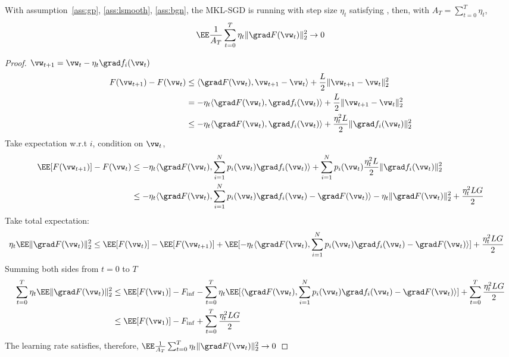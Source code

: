 \begin{theorem}
	With assumption~\ref{ass:gp}, \ref{ass:lsmooth}, \ref{ass:bgn}, the MKL-SGD is running with
	step size $\eta_t$ satisfying \eq{\ref{eq:stepsize}}, then, with $A_T =\sum_{t=0}^T\eta_t $, 
	\begin{equation}
		\EE \frac{1}{A_T}\sum_{t=0}^T \eta_t\|\grad F(\vw_t)\|_2^2 \rightarrow 0
	\end{equation}
\end{theorem}
\begin{proof}
$\vw_{t+1} = \vw_t - \eta_t \grad f_i(\vw_t)$
\begin{align*}
	F(\vw_{t+1}) - F(\vw_{t}) & \leq \langle \grad F(\vw_t), \vw_{t+1} - \vw_t \rangle + \frac{L}{2}\|\vw_{t+1} - \vw_t\|_2^2  \\
                              &  = - \eta_t \langle \grad F(\vw_t), \grad f_i(\vw_t)\rangle  + \frac{L}{2}\|\vw_{t+1} - \vw_t\|_2^2  \\
                              & \leq - \eta_t \langle \grad F(\vw_t), \grad f_i(\vw_t)\rangle  + \frac{\eta_t^2 L}{2}\|\grad f_i(\vw_t)\|_2^2 
\end{align*}
Take expectation w.r.t $i$, condition on $\vw_t$, 
\begin{align*}
	\EE[F(\vw_{t+1})] - F(\vw_{t}) & \leq - \eta_t \langle \grad F(\vw_t),\sum_{i=1}^N p_i(\vw_t)\grad f_i(\vw_t) \rangle + \sum_{i=1}^N p_i(\vw_t) \frac{\eta_t^2 L}{2}\|\grad f_i(\vw_t)\|_2^2 \\
	&  \leq - \eta_t \langle \grad F(\vw_t),\sum_{i=1}^N p_i(\vw_t)\grad f_i(\vw_t) - \grad F(\vw_t) \rangle - \eta_t \|\grad F(\vw_t)\|_2^2 +  \frac{\eta_t^2 LG}{2}\\
\end{align*}
Take total expectation: 
\begin{align*}
	\eta_t\EE \|\grad F(\vw_t)\|_2^2 &\leq \EE[F(\vw_{t})] - \EE[F(\vw_{t+1})] + \EE[- \eta_t \langle \grad F(\vw_t),\sum_{i=1}^N p_i(\vw_t)\grad f_i(\vw_t) - \grad F(\vw_t) \rangle] + \frac{\eta_t^2 LG}{2}
\end{align*}
Summing both sides from $t = 0$ to $T$
\begin{align*}
	\sum_{t=0}^T \eta_t\EE \|\grad F(\vw_t)\|_2^2 &\leq \EE[F(\vw_{1})] - F_{\inf} -\sum_{t=0}^T \eta_t \EE[ \langle \grad F(\vw_t),\sum_{i=1}^N p_i(\vw_t)\grad f_i(\vw_t) - \grad F(\vw_t) \rangle] + \sum_{t=0}^T \frac{\eta_t^2 LG}{2} \\
	& \leq \EE[F(\vw_{1})] - F_{\inf} + \sum_{t=0}^T \frac{\eta_t^2 LG}{2} 
\end{align*}
The learning rate satisfies\eq{\ref{eq:stepsize}}, therefore, $\EE \frac{1}{A_T}\sum_{t=0}^T \eta_t \|\grad F(\vw_t)\|_2^2 \rightarrow 0$
	
\end{proof}

